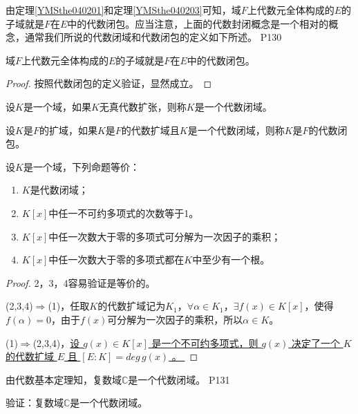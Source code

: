 \original
{
	由定理\ref{YMSthe040201}和定理\ref{YMSthe040203}可知，域$F$上代数元全体构成的$E$的子域就是$F$在$E$中的代数闭包。应当注意，上面的代数封闭概念是一个相对的概念，通常我们所说的代数闭域和代数闭包的定义如下所述。
}
{P130}

\begin{proposition}
	域$F$上代数元全体构成的$E$的子域就是$F$在$E$中的代数闭包。
\end{proposition}

\begin{proof}
	按照代数闭包的定义验证，显然成立。
\end{proof}

\begin{definition}\label{YMSdef040202}
	设$K$是一个域，如果$K$无真代数扩张，则称$K$是一个代数闭域。
\end{definition}

\begin{definition}\label{YMSdef040203}
	设$K$是$F$的扩域，如果$K$是$F$的代数扩域且$K$是一个代数闭域，则称$K$是$F$的代数闭包。
\end{definition}

\begin{theorem}
	设$K$是一个域，下列命题等价：
	\begin{enumerate}
		\item $K$是代数闭域；
		\item $K[x]$中任一不可约多项式的次数等于1。
		\item $K[x]$中任一次数大于零的多项式可分解为一次因子的乘积；
		\item $K[x]$中任一次数大于零的多项式都在$K$中至少有一个根。
	\end{enumerate}
\end{theorem}

\begin{proof}
	2，3，4容易验证是等价的。
	\par
	(2,3,4)$\Rightarrow$(1)，任取$K$的代数扩域记为$K_{1}$，$\forall \alpha\in K_{1}$，$\exists f(x)\in K[x]$，使得$f(\alpha)=0$，由于$f(x)$可分解为一次因子的乘积，所以$\alpha\in K$。
	\par
	(1)$\Rightarrow$(2,3,4)，\uline{设 $g(x)\in K[x]$ 是一个不可约多项式，则 $g(x)$ 决定了一个 $K$ 的代数扩域 $E$ 且 $[E:K]=deg\, g(x)$ 。  }
\end{proof}

\original
{
	由代数基本定理知，复数域$\mathbb{C}$是一个代数闭域。
}
{P131}

\begin{proposition}
	验证：复数域$\mathbb{C}$是一个代数闭域。
\end{proposition}


